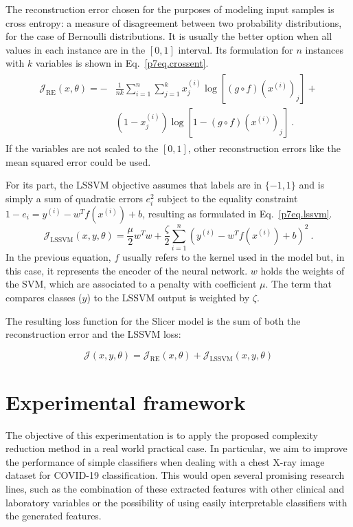 The reconstruction error chosen for the purposes of modeling input samples is cross entropy: a measure of disagreement between two probability distributions, for the case of Bernoulli distributions. It is usually the better option when all values in each instance are in the $[0,1]$ interval.  Its formulation for $n$ instances with $k$ variables is shown in Eq.~\ref{p7eq.crossent}.
\begin{align}
\begin{split}\label{p7eq.crossent}
    \mathcal J_{\mbox{RE}}(x,\theta)=-&\frac{1}{nk}\sum_{i=1}^n\sum_{j=1}^k x^{(i)}_j \log\left[ (g\circ f)\left(x^{(i)}\right)_j\right] +\\& \left(1-x^{(i)}_j\right)\log\left[1-(g\circ f)\left(x^{(i)}\right)_j\right]~.
\end{split}
\end{align}
If the variables are not scaled to the $[0,1]$, other reconstruction errors like the mean squared error could be used.

For its part, the LSSVM objective assumes that labels are in $\{-1,1\}$ and is simply a sum of quadratic errors $e_i^2$ subject to the equality constraint $1-e_i=y^{(i)}-w^Tf\left(x^{(i)}\right)+b$, resulting as formulated in Eq.~\ref{p7eq.lssvm}.
\begin{equation}\label{p7eq.lssvm}
    \mathcal J_{\mbox{LSSVM}}(x,y,\theta)=\frac\mu 2w^Tw+\frac \zeta 2\sum_{i=1}^n \left(y^{(i)}-w^Tf\left(x^{(i)}\right)+b\right)^2~.
\end{equation}
In the previous equation, $f$ usually refers to the kernel used in the model but, in this case, it represents the encoder of the neural network. $w$ holds the weights of the SVM, which are associated to a penalty with coefficient $\mu$. The term that compares classes ($y$) to the LSSVM output is weighted by $\zeta$.

The resulting loss function for the Slicer model is the sum of both the reconstruction error and the LSSVM loss:

\begin{equation}
    \mathcal{J}(x,y,\theta)=\mathcal J_{\mbox{RE}}(x,\theta)+\mathcal J_{\mbox{LSSVM}}(x,y,\theta)
\end{equation}

\section{Experimental framework}\label{p7sec.exp}

The objective of this experimentation is to apply the proposed complexity reduction method in a real world practical case. In particular, we aim to improve the performance of simple classifiers when dealing with a chest X-ray image dataset for COVID-19 classification. This would open several promising research lines, such as the combination of these extracted features with other clinical and laboratory variables or the possibility of using easily interpretable classifiers with the generated features.

